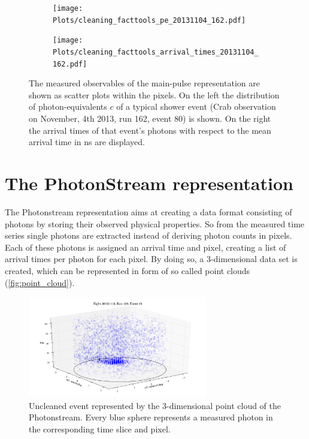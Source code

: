 \begin{figure}
  \begin{subfigure}{0.475\textwidth}
    \texttt{[image: Plots/cleaning\_facttools\_pe\_20131104\_162.pdf]}
  \end{subfigure}
  \begin{subfigure}{0.475\textwidth}
    \texttt{[image: Plots/cleaning\_facttools\_arrival\_times\_20131104\_162.pdf]}
  \end{subfigure}
  \caption{The measured observables of the main-pulse representation are shown as scatter plots within the pixels. On the left the distribution of photon-equivalents $c$ of a typical shower event (Crab observation on November, 4th 2013, run 162, event 80) is shown. On the right the arrival times of that event's photons with respect to the mean arrival time in ns are displayed.}
  \label{fig:mainpulse}
\end{figure}

\section{The PhotonStream representation}

The Photonstream representation aims at creating a data format consisting of photons by storing their observed physical properties. So from the measured time series single photons are extracted instead of deriving photon counts in pixels. Each of these photons is assigned an arrival time and pixel, creating a list of arrival times per photon for each pixel. By doing so, a 3-dimensional data set is created, which can be represented in form of so called point clouds (\autoref{fig:point_cloud}).
%
\begin{figure}
  \centering
  \includegraphics[width=0.7\textwidth]{Plots/event2.png}
  \caption{Uncleaned event represented by the 3-dimensional point cloud of the Photonstream. Every blue sphere represents a measured photon in the corresponding time slice and pixel.}
  \label{fig:point_cloud}
\end{figure}
%
